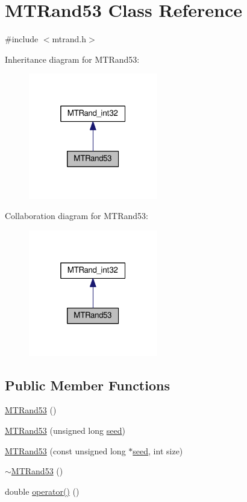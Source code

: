 \hypertarget{a00017}{\section{M\-T\-Rand53 Class Reference}
\label{a00017}
}


{\ttfamily \#include $<$mtrand.\-h$>$}



Inheritance diagram for M\-T\-Rand53\-:\nopagebreak
\begin{figure}[H]
\begin{center}
\leavevmode
\includegraphics[width=160pt]{a00100}
\end{center}
\end{figure}


Collaboration diagram for M\-T\-Rand53\-:\nopagebreak
\begin{figure}[H]
\begin{center}
\leavevmode
\includegraphics[width=160pt]{a00101}
\end{center}
\end{figure}
\subsection*{Public Member Functions}
\begin{DoxyCompactItemize}
\item 
\hyperlink{a00017_a24711c9e6e5ee72715f34515d1f1939a}{M\-T\-Rand53} ()
\item 
\hyperlink{a00017_ad800887e15d4095f22facdb67f270c5e}{M\-T\-Rand53} (unsigned long \hyperlink{a00019_a0c57076fe30358e0700a7ce1baa0ea27}{seed})
\item 
\hyperlink{a00017_ac77b190d3ac27adea2d2c6c2ce2347c3}{M\-T\-Rand53} (const unsigned long $\ast$\hyperlink{a00019_a0c57076fe30358e0700a7ce1baa0ea27}{seed}, int size)
\item 
\hyperlink{a00017_a947a6a7afd0c8a17612cda3faa705a75}{$\sim$\-M\-T\-Rand53} ()
\item 
double \hyperlink{a00017_ab6657cb5349f39bc4553d3a970458b45}{operator()} ()
\end{DoxyCompactItemize}
